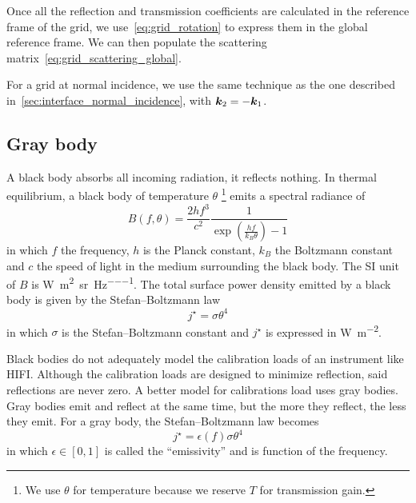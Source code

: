 Once all the reflection and transmission coefficients are calculated in the reference frame of the grid, we use~\cref{eq:grid_rotation} to express them in the global reference frame.
We can then populate the scattering matrix~\cref{eq:grid_scattering_global}.

For a grid at normal incidence, we use the same technique as the one described in~\vref{sec:interface_normal_incidence}, \textit{} with $\bm{k}_2=-\bm{k}_1$.






\subsection{Gray body}
\label{sec:gray_body}
A black body absorbs all incoming radiation, it reflects nothing.
In thermal equilibrium, a black body of temperature $\theta$%
\footnote{
    We use $\theta$ for temperature because we reserve $T$ for transmission gain.
}
emits a spectral radiance of
\begin{equation}
    B(f, \theta) =
    \frac{2 h f^3}{c^2}
    \frac{1}{
        \exp \left(
            \frac{h f}{k_B \theta}
        \right)
        -1
    }
\end{equation}
in which $f$ the frequency, $h$ is the Planck constant, $k_B$ the Boltzmann constant and $c$ the speed of light in the medium surrounding the black body.
The SI unit of $B$ is \si{\watt\per\meter\squared\per\steradian\per\hertz}.
The total surface power density emitted by a black body is given by the Stefan--Boltzmann law
\begin{equation}
    j^\star = \sigma \theta^4
\end{equation}
in which $\sigma$ is the Stefan--Boltzmann constant and
$j^\star$ is expressed in \si{\watt\per\meter\squared}.

Black bodies do not adequately model the calibration loads of an instrument like HIFI.
Although the calibration loads are designed to minimize reflection, said reflections are never zero.
A better model for calibrations load uses gray bodies.
Gray bodies emit and reflect at the same time,
but the more they reflect, the less they emit.
For a gray body, the Stefan--Boltzmann law becomes
\begin{equation}
    j^\star = \epsilon(f) \sigma \theta^4
\end{equation}
in which $\epsilon \in [0,1]$ is called the ``emissivity'' and is function of the frequency.

